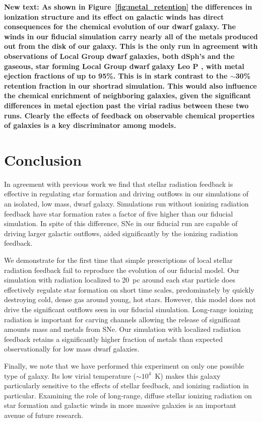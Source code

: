 \documentclass[twocolumn]{aastex62}
\begin{document}
{\textbf{New text: As shown in Figure~\ref{fig:metal_retention} the differences in ionization structure and its effect on galactic winds has direct consequences for the chemical evolution of our dwarf galaxy. The winds in our fiducial simulation carry nearly all of the metals produced out from the disk of our galaxy. This is the only run in agreement with observations of Local Group dwarf galaxies, both dSph's \citep{Kirby2011} and the gaseous, star forming Local Group dwarf galaxy Leo P \citep{McQuinn2015}, with metal ejection fractions of up to 95\%. This is in stark contrast to the $\sim$30\% retention fraction in our shortrad simulation. This would also influence the chemical enrichment of neighboring galaxies, given the significant differences in metal ejection past the virial radius between these two runs. Clearly the effects of feedback on observable chemical properties of galaxies is a key discriminator among models.}

\section{Conclusion}  \label{sec:conclusion}
In agreement with previous work we find that stellar radiation feedback is effective in regulating star formation and driving outflows in our simulations of an isolated, low mass, dwarf galaxy. Simulations run without ionizing radiation feedback have star formation rates a factor of five higher than our fiducial simulation. In spite of this difference, SNe in our fiducial run are capable of driving larger galactic outflows, aided significantly by the ionizing radiation feedback.

We demonstrate for the first time that simple prescriptions of local stellar radiation feedback fail to reproduce the evolution of our fiducial model. Our simulation with radiation localized to 20~pc around each star particle does effectively regulate star formation on short time scales, predominately by quickly destroying cold, dense gas around young, hot stars. However, this model does not drive the significant outflows seen in our fiducial simulation. Long-range ionizing radiation is important for carving channels allowing the release of significant amounts mass and metals from SNe. Our simulation with localized radiation feedback retains a significantly higher fraction of metals than expected observationally for low mass dwarf galaxies.  

Finally, we note that we have performed this experiment on only one possible type of galaxy. Its low virial temperature ($\sim10^{4}$~K) makes this galaxy particularly sensitive to the effects of stellar feedback, and ionizing radiation in particular. Examining the role of long-range, diffuse stellar ionizing radiation on star formation and galactic winds in more massive galaxies is an important avenue of future research. 

}
\end{document}
